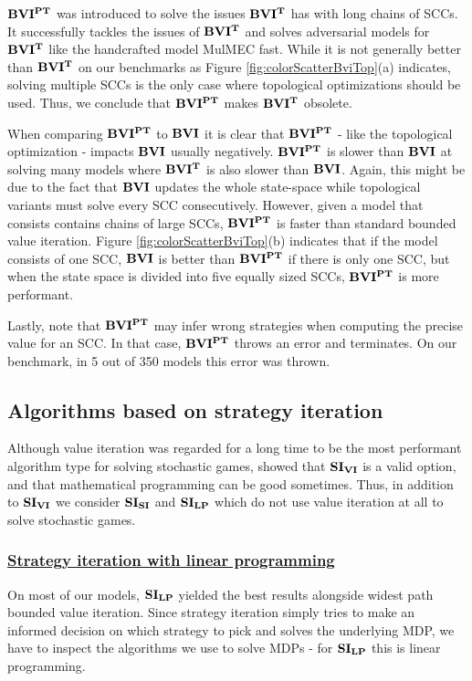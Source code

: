 $\mathbf{BVI^{PT}}$ was introduced to solve the issues $\mathbf{BVI^T}$ has with long chains of SCCs.
It successfully tackles the issues of $\mathbf{BVI^T}$ and solves adversarial models for $\mathbf{BVI^T}$ like the handcrafted model MulMEC fast.
While it is not generally better than $\mathbf{BVI^T}$ on our benchmarks as Figure \ref{fig:colorScatterBviTop}(a) indicates, 
solving multiple SCCs is the only case where topological optimizations should be used. 
Thus, we conclude that $\mathbf{BVI^{PT}}$ makes $\mathbf{BVI^T}$ obsolete.

When comparing $\mathbf{BVI^{PT}}$ to $\mathbf{BVI}$ it is clear that $\mathbf{BVI^{PT}}$ - like the topological optimization - impacts $\mathbf{BVI}$ usually negatively. 
$\mathbf{BVI^{PT}}$ is slower than $\mathbf{BVI}$ at solving many models where $\mathbf{BVI^T}$ is also slower than $\mathbf{BVI}$.
Again, this might be due to the fact that $\mathbf{BVI}$ updates the whole state-space while topological variants must solve every SCC consecutively.
However, given a model that consists contains chains of large SCCs, $\mathbf{BVI^{PT}}$ is faster than standard bounded value iteration.
Figure \ref{fig:colorScatterBviTop}(b) indicates that if the model consists of one SCC, $\mathbf{BVI}$ is better than $\mathbf{BVI^{PT}}$ if there is only one SCC, 
but when the state space is divided into five equally sized SCCs, $\mathbf{BVI^{PT}}$ is more performant.

Lastly, note that $\mathbf{BVI^{PT}}$ may infer wrong strategies when computing the precise value for an SCC. 
In that case, $\mathbf{BVI^{PT}}$ throws an error and terminates. On our benchmark, in 5 out of 350 models this error was thrown.
\FloatBarrier

\subsection{Algorithms based on strategy iteration}
Although value iteration was regarded for a long time to be the most performant algorithm type for solving stochastic games, 
\cite{gandalf} showed that $\mathbf{SI_{VI}}$ is a valid option, and that mathematical programming can be good sometimes.
Thus, in addition to $\mathbf{SI_{VI}}$ we consider $\mathbf{SI_{SI}}$ and $\mathbf{SI_{LP}}$ which do not use value iteration at all to solve stochastic games.

\subsubsection*{\underline{Strategy iteration with linear programming}}
On most of our models, $\mathbf{SI_{LP}}$ yielded the best results alongside widest path bounded value iteration.
Since strategy iteration simply tries to make an informed decision on which strategy to pick and solves the underlying MDP, 
we have to inspect the algorithms we use to solve MDPs - for $\mathbf{SI_{LP}}$ this is linear programming.

